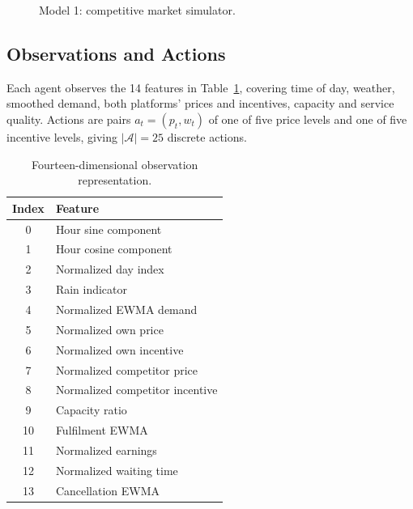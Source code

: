 \documentclass[conference]{IEEEtran}
\begin{document}
\begin{figure}[!t]
\centering
{}
\caption{Model 1: competitive market simulator.}
\label{fig:m1arch}
\end{figure}

\subsection{Observations and Actions}
Each agent observes the 14 features in Table~\ref{tab:obs}, covering time of day, weather, smoothed demand, both platforms' prices and incentives, capacity and service quality. Actions are pairs $a_t=(p_t,w_t)$ of one of five price levels and one of five incentive levels, giving $|\mathcal{A}|=25$ discrete actions.

\begin{table}[!t]
\centering
\caption{Fourteen-dimensional observation representation.}
\label{tab:obs}
\small
\begin{tabular}{cl}
\toprule
\textbf{Index} & \textbf{Feature} \\
\midrule
0  & Hour sine component \\
1  & Hour cosine component \\
2  & Normalized day index \\
3  & Rain indicator \\
4  & Normalized EWMA demand \\
5  & Normalized own price \\
6  & Normalized own incentive \\
7  & Normalized competitor price \\
8  & Normalized competitor incentive \\
9  & Capacity ratio \\
10 & Fulfilment EWMA \\
11 & Normalized earnings \\
12 & Normalized waiting time \\
13 & Cancellation EWMA \\
\bottomrule
\end{tabular}
\end{table}
\end{document}
